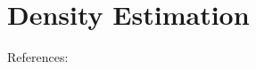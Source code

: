 \chapter{Density Estimation}
\label{chp:pdfest}

References:
\begin{liste}
  \item {}
\end{liste}


